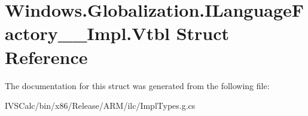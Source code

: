 \hypertarget{struct_windows_1_1_globalization_1_1_i_language_factory_____impl_1_1_vtbl}{}\section{Windows.\+Globalization.\+I\+Language\+Factory\+\_\+\+\_\+\+Impl.\+Vtbl Struct Reference}
\label{struct_windows_1_1_globalization_1_1_i_language_factory_____impl_1_1_vtbl}


The documentation for this struct was generated from the following file\+:\begin{DoxyCompactItemize}
\item 
I\+V\+S\+Calc/bin/x86/\+Release/\+A\+R\+M/ilc/Impl\+Types.\+g.\+cs\end{DoxyCompactItemize}
